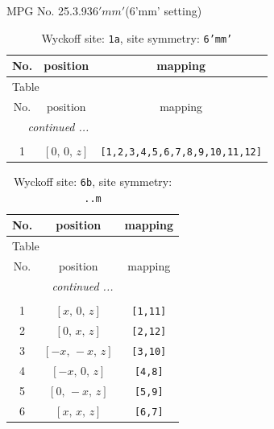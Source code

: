 \documentclass[fleqn,8pt]{jsarticle}
\begin{document}
\setcounter{MaxMatrixCols}{32}

\renewcommand{\tablename}{Table~}
\renewcommand{\figurename}{Figure~}
\begin{center}
\LARGE
MPG No. 25.3.93\quad$6'mm'$\quad(6'mm' setting)
\end{center}
\renewcommand{\arraystretch}{1.2}
\begin{longtable}{ccc}
\caption{Wyckoff site: {\tt 1a}, site symmetry: {\tt 6'mm'}}
 \\
 \hline \hline
No. & position & mapping \\ \hline \endfirsthead

\multicolumn{2}{l}{\tablename\ \thetable{}} \\
 \hline \hline
No. & position & mapping \\ \hline \endhead

 \hline \hline
\multicolumn{2}{r}{\footnotesize\it continued ...} \\ \endfoot

 \hline \hline
\multicolumn{2}{r}{} \\ \endlastfoot

1 & $\left[ 0,\, 0,\, z \right]$ & {\tt [1,2,3,4,5,6,7,8,9,10,11,12]} \\
\end{longtable}
\renewcommand{\arraystretch}{1.2}
\begin{longtable}{ccc}
\caption{Wyckoff site: {\tt 6b}, site symmetry: {\tt ..m}}
 \\
 \hline \hline
No. & position & mapping \\ \hline \endfirsthead

\multicolumn{2}{l}{\tablename\ \thetable{}} \\
 \hline \hline
No. & position & mapping \\ \hline \endhead

 \hline \hline
\multicolumn{2}{r}{\footnotesize\it continued ...} \\ \endfoot

 \hline \hline
\multicolumn{2}{r}{} \\ \endlastfoot

1 & $\left[ x,\, 0,\, z \right]$ & {\tt [1,11]} \\ \hline
2 & $\left[ 0,\, x,\, z \right]$ & {\tt [2,12]} \\ \hline
3 & $\left[ - x,\, - x,\, z \right]$ & {\tt [3,10]} \\ \hline
4 & $\left[ - x,\, 0,\, z \right]$ & {\tt [4,8]} \\ \hline
5 & $\left[ 0,\, - x,\, z \right]$ & {\tt [5,9]} \\ \hline
6 & $\left[ x,\, x,\, z \right]$ & {\tt [6,7]} \\
\end{longtable}
\end{document}
